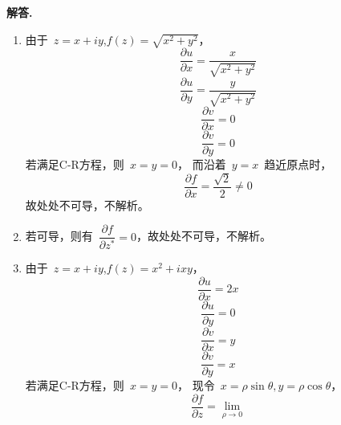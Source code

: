 \documentclass[11pt]{ctexart}
\newenvironment{solution}{\par\noindent\textbf{解答. }}{\par}
\begin{document}
\begin{solution}
    \begin{enumerate}[(1)]
        \item 由于\ $z=x+iy$,$f(z)=\sqrt{x^2+y^2}$，
              \begin{equation*}
                  \dfrac{\partial u}{\partial x} = \dfrac{x}{\sqrt{x^2+y^2}}
              \end{equation*}
              \begin{equation*}
                  \dfrac{\partial u}{\partial y} = \dfrac{y}{\sqrt{x^2+y^2}}
              \end{equation*}
              \begin{equation*}
                  \dfrac{\partial v}{\partial x} = 0
              \end{equation*}
              \begin{equation*}
                  \dfrac{\partial v}{\partial y} = 0
              \end{equation*}
              若满足C-R方程，则\ $x=y=0$，
              而沿着\ $y=x$\ 趋近原点时，
              \begin{equation*}
                  \dfrac{\partial f}{\partial x} = \dfrac{\sqrt{2}}{2} \neq 0
              \end{equation*}
              故处处不可导，不解析。
        \item 若可导，则有\ $\dfrac{\partial f}{\partial z^*} = 0$，故处处不可导，不解析。
        \item 由于\ $z=x+iy$,$f(z)= x^2+ixy$，
              \begin{equation*}
                  \dfrac{\partial u}{\partial x} = 2x
              \end{equation*}
              \begin{equation*}
                  \dfrac{\partial u}{\partial y} = 0
              \end{equation*}
              \begin{equation*}
                  \dfrac{\partial v}{\partial x} = y
              \end{equation*}
              \begin{equation*}
                  \dfrac{\partial v}{\partial y} = x
              \end{equation*}
              若满足C-R方程，则\ $x=y=0$，
              现令\ $x=\rho\sin{\theta},y=\rho\cos{\theta}$，
              \begin{equation*}
                  \dfrac{\partial f}{\partial z} = \lim\limits_{\rho\to 0}

\end{equation*}
\end{enumerate}
\end{solution}
\end{document}
